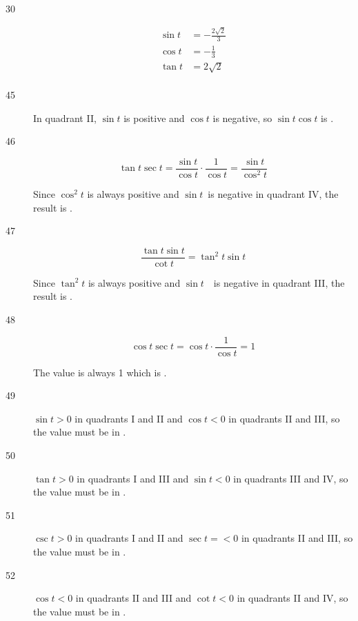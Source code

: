 \documentclass{exam}
\begin{document}
\begin{description}
      \item[30]
        \begin{align*}
          \sin t & = \boxed{ - \frac{2 \sqrt{2}}{3} } \\
          \cos t & = \boxed{ - \frac{1}{3} } \\
          \tan t & = \boxed{ 2 \sqrt{2} } \\
        \end{align*}

      \item[45]
        In quadrant II, $\sin t$ is positive and $\cos t$ is negative, so $\sin t \cos t$ is .

      \pagebreak

      \item[46]
        \[
          \tan t \sec t = \frac{\sin t}{\cos t} \cdot \frac{1}{\cos t} = \frac{\sin t}{\cos^2 t}
        \]

        Since $\cos^2 t$ is always positive and $\sin t$ is negative in quadrant IV, the result is .

      \item[47]
        \[
          \frac{\tan t \sin t}{\cot t} = \tan^2 t \sin t
        \]

        Since $\tan^2 t$ is always positive and $\sin t$ \ is negative in quadrant III, the result is .

      \item[48]
        \[
          \cos t \sec t = \cos t \cdot \frac{1}{\cos t} = 1
        \]

        The value is always 1 which is .

      \item[49] $\sin t > 0$ in quadrants I and II and $\cos t < 0$ in quadrants II and III, so the value must be in
        .

      \item[50] $\tan t > 0$ in quadrants I and III and $\sin t < 0$ in quadrants III and IV, so the value must be in
        .

      \item[51] $\csc t > 0$ in quadrants I and II and $\sec t = < 0$ in quadrants II and III, so the value must be in
        .

      \item[52] $\cos t < 0$ in quadrants II and III and $\cot t < 0$ in quadrants II and IV, so the value must be in
        .


\end{description}
\end{document}
